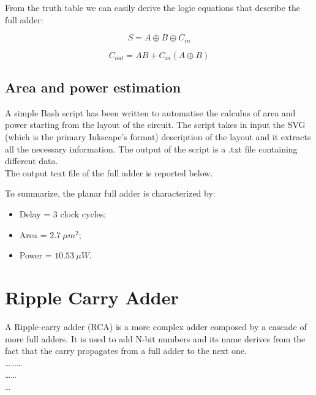 From the truth table we can easily derive the logic equations that describe the full adder:


	\begin{equation}
	S = A \oplus B \oplus C_{in}
	\label{eq:1}
	\end{equation}

	\begin{equation}
	C_{out} = AB + C_{in}( A \oplus B)
	\label{eq:2}
	\end{equation}
	
\subsection{Area and power estimation}

A simple Bash script has been written to automatise the calculus of area and power starting from the layout of the circuit. The script takes in input the SVG (which is the primary Inkscape's format) description of the layout and it extracts all the necessary information. The output of the script is a .txt file containing different data.\\
The output text file of the full adder is reported below.

  



To summarize, the planar full adder is characterized by:
\begin{itemize}
\item Delay = 3 clock cycles;
\item Area = $2.7\ \mu m^2$;
\item Power = $10.53\ \mu W$.
\end{itemize}
	
\section{Ripple Carry Adder}

A Ripple-carry adder (RCA) is a more complex adder composed by a cascade of more full adders. It is used to add N-bit numbers and its name derives from the fact that the carry propagates from a full adder to the next one.\\
\dots \dots \dots \\
\dots \dots \\
\dots